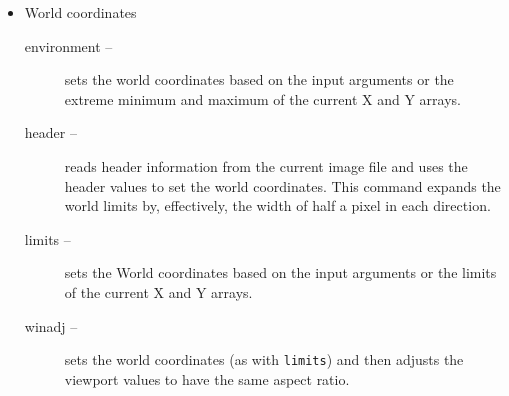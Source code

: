 \begin{itemize}
  \item World coordinates
  \begin{description}
    \item [{environment --}]
      sets the world coordinates based on the input arguments or
      the extreme minimum and maximum of the current X and Y arrays.
    \item [{header --}]
      reads header information from the current image file and
      uses the header values to set the world coordinates.
      This command expands the world limits by, effectively,
      the width of half a pixel in each direction.
    \item [{limits --}]
      sets the World coordinates based on the input arguments or
      the limits of the current X and Y arrays.
    \item [{winadj --}]
      sets the world coordinates (as with {\tt limits})
      and then adjusts the viewport
      values to have the same aspect ratio.
  \end{description}


\end{itemize}

